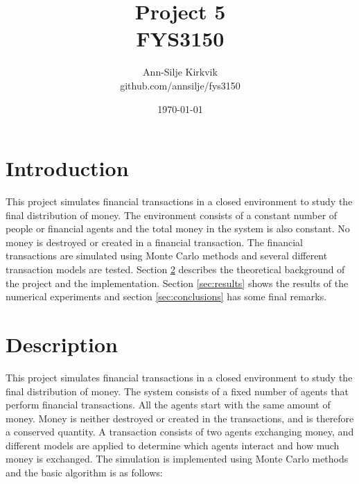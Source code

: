\documentclass{article}
\begin{document}
\title{\vspace{1cm}Project 5 \\ FYS3150}

\author{\vspace{1cm}Ann-Silje Kirkvik \\ github.com/annsilje/fys3150}
\date{\vspace{5cm}\today}

\maketitle

\newpage

\begin{abstract}

\end{abstract}

\vspace{1cm}


\section{Introduction}
This project simulates financial transactions in a closed environment to study the final distribution of money. The environment consists of a constant number of people or financial agents and the total money in the system is also constant. No money is destroyed or created in a financial transaction. The financial transactions are simulated using Monte Carlo methods and several different transaction models are tested. Section \ref{sec:description} describes the theoretical background of the project and the implementation. Section \ref{sec:results} shows the results of the numerical experiments and section \ref{sec:conclusions} has some final remarks.

\section{Description}
\label{sec:description}
This project simulates financial transactions in a closed environment to study the final distribution of money. The system consists of a fixed number of agents that perform financial transactions. All the agents start with the same amount of money. Money is neither destroyed or created in the transactions, and is therefore a conserved quantity. A transaction consists of two agents exchanging money, and different models are applied to determine which agents interact and how much money is exchanged. The simulation is implemented using Monte Carlo methods and the basic algorithm is as follows:
\end{document}
